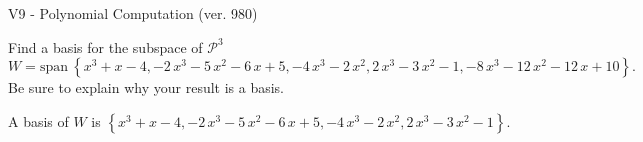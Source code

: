 \begin{exercise}
  \begin{exerciseTitle}V9 - Polynomial Computation (ver. 980)\end{exerciseTitle}
  \begin{exerciseStatement}
    Find a basis for the subspace of \(\mathcal{P}^3\) 
\[W=\mathrm{span}\ \left\{x^{3} + x - 4 , -2 \, x^{3} - 5 \, x^{2} - 6 \, x + 5 , -4 \, x^{3} - 2 \, x^{2} , 2 \, x^{3} - 3 \, x^{2} - 1 , -8 \, x^{3} - 12 \, x^{2} - 12 \, x + 10\right\}.\]
 Be sure to explain why your result is a basis.


  \end{exerciseStatement}
  \begin{exerciseAnswer}
   A basis of \(W\) is  \(\left\{x^{3} + x - 4 , -2 \, x^{3} - 5 \, x^{2} - 6 \, x + 5 , -4 \, x^{3} - 2 \, x^{2} , 2 \, x^{3} - 3 \, x^{2} - 1\right\}\).
  


  \end{exerciseAnswer}
\end{exercise}